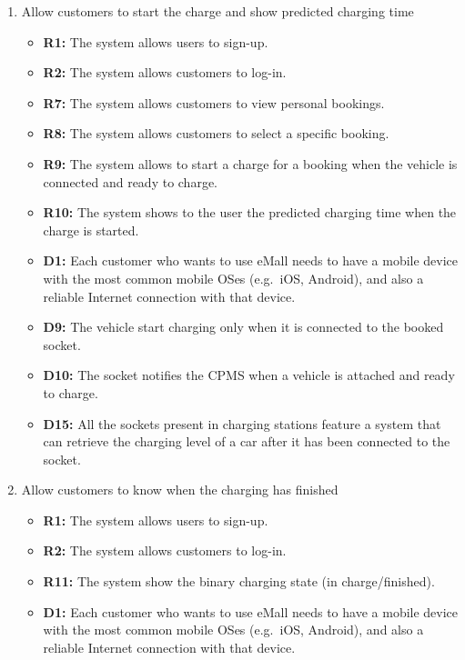 \begin{enumerate}[label=\textbf{-G\arabic*}:]
{\begin{itemize}
          \end{itemize}
          }
    \item {Allow customers to start the charge and show predicted charging time
          \begin{itemize}
            \item \textbf{R1:} The system allows users to sign-up.
            \item \textbf{R2:} The system allows customers to log-in.
            \item \textbf{R7:} The system allows customers to view personal bookings.
            \item \textbf{R8:} The system allows customers to select a specific booking.
            \item \textbf{R9:} The system allows to start a charge for a booking when the vehicle is connected and ready to charge.
            \item \textbf{R10:} The system shows to the user the predicted charging time when the charge is started.
            \item \textbf{D1:} Each customer who wants to use eMall needs to have a mobile device with the most common mobile OSes (e.g.\ iOS, Android), and also a reliable Internet connection with that device.
            \item \textbf{D9:} The vehicle start charging only when it is connected to the booked socket.
            \item \textbf{D10:} The socket notifies the CPMS when a vehicle is attached and ready to charge.
            \item \textbf{D15:} All the sockets present in charging stations feature a system that can retrieve the charging level of a car after it has been connected to the socket.
          \end{itemize}
          }
    \item {Allow customers to know when the charging has finished
          \begin{itemize}
            \item \textbf{R1:} The system allows users to sign-up.
            \item \textbf{R2:} The system allows customers to log-in.
            \item \textbf{R11:} The system show the binary charging state (in charge/finished).
            \item \textbf{D1:} Each customer who wants to use eMall needs to have a mobile device with the most common mobile OSes (e.g.\ iOS, Android), and also a reliable Internet connection with that device.

\end{itemize}}
\end{enumerate}
